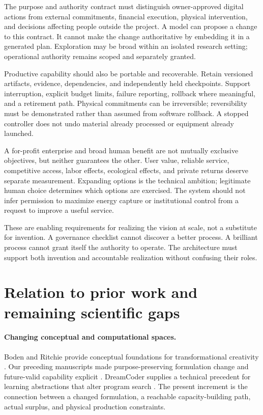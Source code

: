 \documentclass[11pt,letterpaper]{article}
\newcommand{\1}{\mathbf 1}
\theoremstyle{remark}\newtheorem{remark}{Remark}[section]
\begin{document}
The purpose and authority contract must distinguish owner-approved digital actions from external commitments, financial execution, physical intervention, and decisions affecting people outside the project. A model can propose a change to this contract. It cannot make the change authoritative by embedding it in a generated plan. Exploration may be broad within an isolated research setting; operational authority remains scoped and separately granted.

Productive capability should also be portable and recoverable. Retain versioned artifacts, evidence, dependencies, and independently held checkpoints. Support interruption, explicit budget limits, failure reporting, rollback where meaningful, and a retirement path. Physical commitments can be irreversible; reversibility must be demonstrated rather than assumed from software rollback. A stopped controller does not undo material already processed or equipment already launched.

A for-profit enterprise and broad human benefit are not mutually exclusive objectives, but neither guarantees the other. User value, reliable service, competitive access, labor effects, ecological effects, and private returns deserve separate measurement. Expanding options is the technical ambition; legitimate human choice determines which options are exercised. The system should not infer permission to maximize energy capture or institutional control from a request to improve a useful service.

These are enabling requirements for realizing the vision at scale, not a substitute for invention. A governance checklist cannot discover a better process. A brilliant process cannot grant itself the authority to operate. The architecture must support both invention and accountable realization without confusing their roles.

\section{Relation to prior work and remaining scientific gaps}\label{sec:related}
\paragraph{Changing conceptual and computational spaces.}
Boden and Ritchie provide conceptual foundations for transformational creativity \citep{boden,ritchie}. Our preceding manuscripts made purpose-preserving formulation change and future-valid capability explicit \citep{boucherTI,boucherOriginal}. DreamCoder supplies a technical precedent for learning abstractions that alter program search \citep{dreamcoder}. The present increment is the connection between a changed formulation, a reachable capacity-building path, actual surplus, and physical production constraints.
\end{document}
